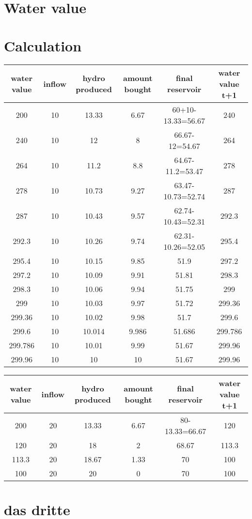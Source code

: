 \documentclass{article}
\begin{document}
\section{Water value}

\section{Calculation}
\begin{center}
\begin{tabular}{|c|c|c|c|c|c|}
\hline
water value & inflow & hydro produced & amount bought & final reservoir	& water value t+1\\
\hline
\hline
200 & 10 & 13.33 & 6.67 & 60+10-13.33=56.67 & 240\\
240 & 10 & 12 & 8 & 66.67-12=54.67 & 264\\
264 & 10 & 11.2 & 8.8 & 64.67-11.2=53.47 & 278\\
278 & 10 & 10.73 & 9.27 & 63.47-10.73=52.74 & 287\\
287 & 10 & 10.43 & 9.57 & 62.74-10.43=52.31 & 292.3\\
292.3 & 10 & 10.26 & 9.74 & 62.31-10.26=52.05 & 295.4\\
295.4 & 10 & 10.15 & 9.85 & 51.9 & 297.2\\
297.2 & 10 & 10.09 & 9.91 & 51.81 & 298.3\\
298.3 & 10 & 10.06 & 9.94 & 51.75 & 299\\
299 & 10 & 10.03 & 9.97 & 51.72 & 299.36\\
299.36 & 10 & 10.02 & 9.98 & 51.7 & 299.6\\
299.6 & 10 & 10.014 & 9.986 & 51.686 & 299.786\\
299.786 & 10 & 10.01 & 9.99 & 51.67 & 299.96\\
\hline
299.96 & 10 & 10 & 10 & 51.67 & 299.96\\
\hline
\end{tabular}
\end{center}


\begin{center}
\begin{tabular}{|c|c|c|c|c|c|}
\hline
water value & inflow & hydro produced & amount bought & final reservoir	& water value t+1\\
\hline
\hline
200 & 20 & 13.33 & 6.67 & 80-13.33=66.67 & 120\\
120 & 20 & 18 & 2 & 68.67 & 113.3\\
113.3 & 20 & 18.67 & 1.33 & 70 & 100\\
\hline
100 & 20 & 20 & 0 & 70 & 100\\
\hline
\end{tabular}
\end{center}
\section{das dritte}
\end{document}
